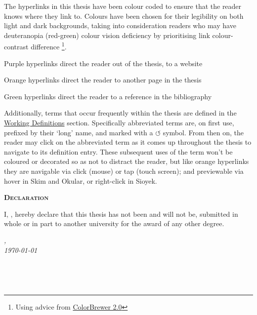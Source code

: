 \begin{SingleSpace}
\noindent The hyperlinks in this thesis have been colour coded to ensure that the reader knows where they link to. Colours have been chosen for their legibility on both light and dark backgrounds, taking into consideration readers who may have deuteranopia (red-green) colour vision deficiency by prioritising link colour-contrast difference \footnote{Using advice from \href{https://colorbrewer2.org/\#type=qualitative\&scheme=Dark2}{ColorBrewer 2.0}}.

\vspace*{0.25cm}
\noindent\textcolor{Hyurlcolor}{Purple} hyperlinks direct the reader out of the thesis, to a website

\noindent\textcolor{Hylinkcolor}{Orange} hyperlinks direct the reader to another page in the thesis

\noindent\textcolor{Hycitecolor}{Green} hyperlinks direct the reader to a reference in the bibliography

\vspace*{0.25cm}
\noindent Additionally, terms that occur frequently within the thesis are defined in the \hyperref[main]{Working Definitions} section. Specifically abbreviated terms are, on first use, prefixed by their `long' name, and marked with a \textcolor{Hylinkcolor}{$\circlearrowleft$} symbol. From then on, the reader may click on the abbreviated term as it comes up throughout the thesis to navigate to its definition entry. These subsequent uses of the term won't be coloured or decorated so as not to distract the reader, but like \textcolor{Hylinkcolor}{orange} hyperlinks they are navigable via click (mouse) or tap (touch screen); and previewable via hover in Skim and Okular, or right-click in Sioyek.

\begin{flushleft}
{}
 \begin{flushleft}
	\Huge \textsc{\textbf{Declaration}}
\end{flushleft}

\begin{flushleft}
	\noindent I, \myName, hereby declare that this thesis has not been and will not be, submitted in whole or in part to another university for the award of any other degree.
\end{flushleft}

\begin{minipage}{.45\linewidth}
	\begin{flushleft} %
		\textit{\myLocation,} \\
		\textit{\today}%
	\end{flushleft}
\end{minipage}
\hfill
\begin{minipage}{.45\linewidth}
	\begin{flushright} %
		\makebox[2.5in]{\hrulefill} \\
		\myName 
	\end{flushright}
\end{minipage}\\
\end{flushleft}
\end{SingleSpace}%